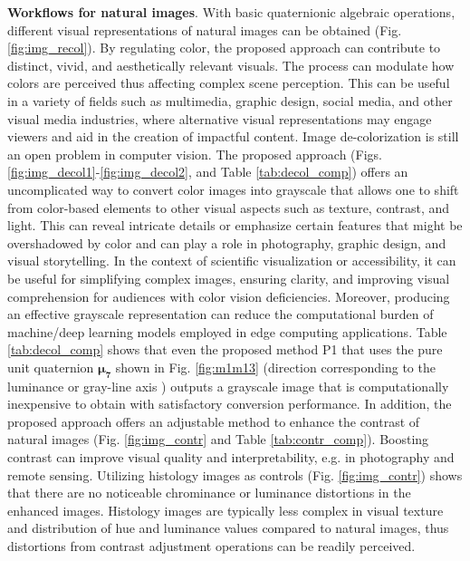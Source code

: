 \documentclass[superscriptaddress,longbibliography,aps,prl,twocolumn,10pt]{revtex4-2}
\begin{document}
\noindent
\textbf{Workflows for natural images}. With basic quaternionic algebraic operations, different visual representations of natural images can be obtained (Fig. \ref{fig:img_recol}). By regulating color, the proposed approach can contribute to distinct, vivid, and aesthetically relevant visuals. The process can modulate how colors are perceived thus affecting complex scene perception. This can be useful in a variety of fields such as multimedia, graphic design, social media, and other visual media industries, where alternative visual representations may engage viewers and aid in the creation of impactful content. Image de-colorization is still an open problem in computer vision. The proposed approach (Figs. \ref{fig:img_decol1}-\ref{fig:img_decol2}, and Table \ref{tab:decol_comp}) offers an uncomplicated way to convert color images into grayscale that allows one to shift from color-based elements to other visual aspects such as texture, contrast, and light. This can reveal intricate details or emphasize certain features that might be overshadowed by color and can play a role in photography, graphic design, and visual storytelling. In the context of scientific visualization or accessibility, it can be useful for simplifying complex images, ensuring clarity, and improving visual comprehension for audiences with color vision deficiencies. Moreover, producing an effective grayscale representation can reduce the computational burden of machine/deep learning models employed in edge computing applications. Table \ref{tab:decol_comp} shows that even the proposed method P1 that uses the pure unit quaternion $\boldsymbol{\mu_7}$ shown in Fig. \ref{fig:m1m13} (direction corresponding to the luminance or gray-line axis \cite{Moxey2003, Ell2007a}) outputs a grayscale image that is computationally inexpensive to obtain with satisfactory conversion performance. In addition, the proposed approach offers an adjustable method to enhance the contrast of natural images (Fig. \ref{fig:img_contr} and Table \ref{tab:contr_comp}). Boosting contrast can improve visual quality and interpretability, e.g. in photography and remote sensing. Utilizing histology images as controls (Fig. \ref{fig:img_contr}) shows that there are no noticeable chrominance or luminance distortions in the enhanced images. Histology images are typically less complex in visual texture and distribution of hue and luminance values compared to natural images, thus distortions from contrast adjustment operations can be readily perceived.
\parskip=5pt
\end{document}
